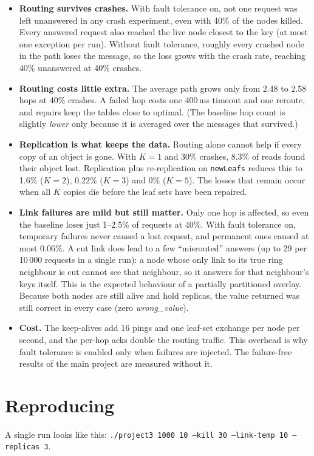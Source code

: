 \documentclass[10pt]{article}
\begin{document}
\begin{itemize}
  \item \textbf{Routing survives crashes.} With fault tolerance on, not one request was left unanswered in any crash experiment, even with 40\% of the nodes killed.
  Every answered request also reached the live node closest to the key (at most one exception per run).
  Without fault tolerance, roughly every crashed node in the path loses the message, so the loss grows with the crash rate, reaching 40\% unanswered at 40\% crashes.
  \item \textbf{Routing costs little extra.} The average path grows only from 2.48 to 2.58 hops at 40\% crashes.
  A failed hop costs one 400\,ms timeout and one reroute, and repairs keep the tables close to optimal.
  (The baseline hop count is slightly \emph{lower} only because it is averaged over the messages that survived.)
  \item \textbf{Replication is what keeps the data.} Routing alone cannot help if every copy of an object is gone.
  With $K=1$ and 30\% crashes, 8.3\% of reads found their object lost.
  Replication plus re-replication on \texttt{newLeafs} reduces this to 1.6\% ($K=2$), 0.22\% ($K=3$) and 0\% ($K=5$).
  The losses that remain occur when all $K$ copies die before the leaf sets have been repaired.
  \item \textbf{Link failures are mild but still matter.} Only one hop is affected, so even the baseline loses just 1--2.5\% of requests at 40\%.
  With fault tolerance on, temporary failures never caused a lost request, and permanent ones caused at most 0.06\%.
  A cut link does lead to a few ``misrouted'' answers (up to 29 per 10\,000 requests in a single run): a node whose only link to its true ring neighbour is cut cannot see that neighbour, so it answers for that neighbour's keys itself.
  This is the expected behaviour of a partially partitioned overlay. Because both nodes are still alive and hold replicas, the value returned was still correct in every case (zero \emph{wrong\_value}).
  \item \textbf{Cost.} The keep-alives add 16 pings and one leaf-set exchange per node per second, and the per-hop acks double the routing traffic.
  This overhead is why fault tolerance is enabled only when failures are injected. The failure-free results of the main project are measured without it.
\end{itemize}

\section{Reproducing}
A single run looks like this: \texttt{./project3 1000 10 --kill 30 --link-temp 10 --replicas 3}.
\end{document}
